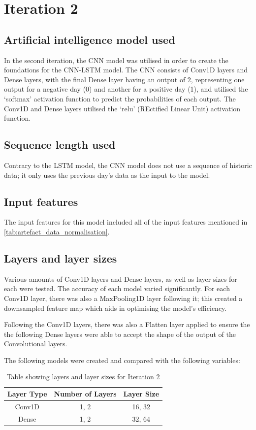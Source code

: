 \section{Iteration 2}
\subsection{Artificial intelligence model used}\label{ssec:iteration2_ai_model}
In the second iteration, the CNN model was utilised in order to create the foundations for the CNN-LSTM model. The CNN
consists of Conv1D layers and Dense layers, with the final Dense layer having an output of 2, representing one output for
a negative day (0) and another for a positive day (1), and utilised the `softmax' activation function to predict the
probabilities of each output. The Conv1D and Dense layers utilised the `relu' (REctified Linear Unit) activation
function.

\subsection{Sequence length used}
Contrary to the LSTM model, the CNN model does not use a sequence of historic data; it only uses the previous day's
data as the input to the model.

\subsection{Input features}
The input features for this model included all of the input features mentioned in \autoref{tab:artefact_data_normalisation}.

\subsection{Layers and layer sizes} \label{ssec:iteration2layers}
Various amounts of Conv1D layers and Dense layers, as well as layer sizes for each were tested. The accuracy of each model varied
significantly. For each Conv1D layer, there was also a MaxPooling1D layer following it; this created a downsampled
feature map which aids in optimising the model's efficiency.

Following the Conv1D layers, there was also a Flatten layer applied to ensure the the following Dense layers
were able to accept the shape of the output of the Convolutional layers.

The following models were created and compared with the following variables:

\begin{table}[ht]
    \centering
    \begin{tabular}{|c|c|c|}
        \hline
        Layer Type & Number of Layers & Layer Size \\
        \hline\hline
        Conv1D & 1, 2 & 16, 32 \\
        Dense & 1, 2 & 32, 64 \\
        \hline
    \end{tabular}
    \caption{Table showing layers and layer sizes for Iteration 2}
    \label{tab:iteration2_layers}
\end{table}
\FloatBarrier

